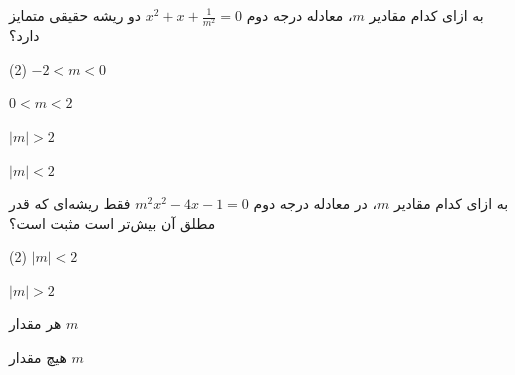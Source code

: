 
\begin{example}
به ازای کدام مقادیر \(m\)، معادله درجه دوم
$x^2+x+\frac{1}{m^2}=0$
دو ریشه حقیقی متمایز دارد؟

\begin{tasks}(2)
    \task \(-2<m<0\)

    \task \(0<m<2\)

    \task \(\lvert m\rvert>2\)

    \task \(\lvert m\rvert<2\)
\end{tasks}

\end{example}



\begin{example}
به ازای کدام مقادیر \(m\)، در معادله درجه دوم
$m^2x^2-4x-1=0$
فقط ریشه‌ای که قدر مطلق آن بیش‌تر است مثبت است؟

\begin{tasks}(2)
    \task \(\lvert m\rvert<2\)

    \task \(\lvert m\rvert>2\)

    \task هر مقدار \(m\)

    \task هیچ مقدار \(m\)
\end{tasks}

\end{example}


